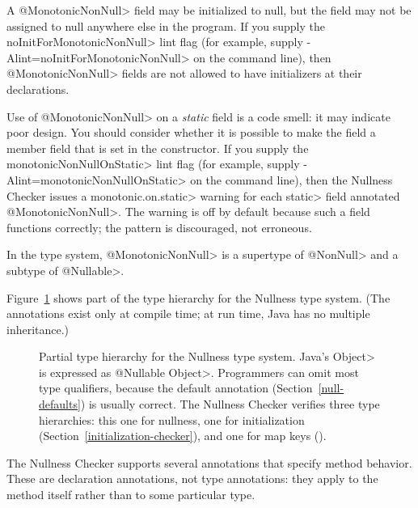 \begin{description}
  A \<@MonotonicNonNull> field may be initialized to null, but the
  field may not be assigned to null anywhere else in the program.  If you
  supply the \<noInitForMonotonicNonNull> lint flag (for example, supply
  \<-Alint=noInitForMonotonicNonNull> on the command line), then
  \<@MonotonicNonNull> fields are not allowed to have initializers at their
  declarations.

  Use of \<@MonotonicNonNull> on a \emph{static} field is a code smell:  it may
  indicate poor design.  You should consider whether it is possible to make
  the field a member field that is set in the constructor.  If you supply the
  \<monotonicNonNullOnStatic> lint flag (for example, supply
  \<-Alint=monotonicNonNullOnStatic> on the command line), then the Nullness
  Checker issues a \<monotonic.on.static> warning for each \<static> field
  annotated \<@MonotonicNonNull>.  The warning is off by default because such a
  field functions correctly; the pattern is discouraged, not erroneous.

  In the type system, \<@MonotonicNonNull> is a supertype of \<@NonNull>
  and a subtype of \<@Nullable>.

\end{description}

Figure~\ref{fig-nullness-hierarchy} shows part of the type hierarchy for the
Nullness type system.
(The annotations exist only at compile time; at run time, Java has no
multiple inheritance.)

\begin{figure}
\caption{Partial type hierarchy for the Nullness type system.
Java's \<Object> is expressed as \<@Nullable Object>.  Programmers can omit
most type qualifiers, because the default annotation
(Section~\ref{null-defaults}) is usually correct.
The Nullness Checker verifies three type hierarchies:  this one for
nullness, one for initialization (Section~\ref{initialization-checker}),
and one for map keys ().}
\label{fig-nullness-hierarchy}
\end{figure}



The Nullness Checker supports several annotations that specify method
behavior.  These are declaration annotations, not type annotations:  they
apply to the method itself rather than to some particular type.


